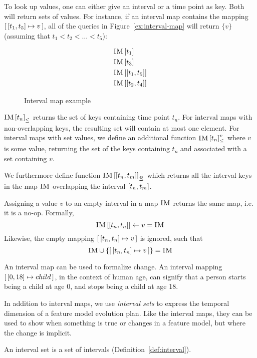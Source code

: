 To look up values, one can either give an interval or a time point as key. Both will return sets of values. For instance, if an interval map  contains the mapping $\intervalmapping{t_1}{t_5}{v}$, all of the queries in Figure~\vref{ex:interval-map} will return $\{v\}$ (assuming that $t_1 < t_2 < \ldots < t_5$):

\begin{figure}[h]
  \begin{align*}
    & \lookup{\map{IM}}{t_1} \\
    & \lookup{\map{IM}}{t_3} \\
    & \lookup{\map{IM}}{\interval{t_1}{t_5}} \\
    & \lookup{\map{IM}}{\interval{t_2}{t_4}}
  \end{align*}
  \caption{Interval map example}
  \label{ex:interval-map}
\end{figure}

${\textsc{IM} \left[ t_n \right]}_{\leq}$ returns the set of keys containing time point $t_n$. For interval maps with non-overlapping keys, the resulting set will contain at most one element. For interval maps with set values, we define an additional function ${\textsc{IM} \left[ t_n \right]^{v}_{\leq}}$ where $v$ is some value, returning the set of the keys containing $t_n$ and associated with a set containing $v$. 

We furthermore define function $\overlapping{\map{IM}}{t_n}{t_m}$ which returns all the interval keys in the map $\textsc{IM}$ overlapping the interval $\interval{t_n}{t_m}$. 

Assigning a value $v$ to an empty interval in a map $\textsc{IM}$ returns the same map, i.e. it is a no-op. Formally,
\[
  \lookup{\map{IM}}{\interval{t_n}{t_n}} \assign v = \map{IM}
\]
Likewise, the empty mapping $\intervalmapping{t_n}{t_n}{v}$ is ignored, such that
\[
  \map{IM} \cup \set{\intervalmapping{t_n}{t_n}{v}} = \map{IM}
\]

An interval map can be used to formalize change. An interval mapping $\intervalmapping{0}{18}{child}$, in the context of human age, can signify that a person starts being a child at age 0, and stops being a child at age 18.

In addition to interval maps, we use \emph{interval sets} to express the temporal dimension of a feature model evolution plan. Like the interval maps, they can be used to show when something is true or changes in a feature model, but where the change is implicit. 
\\
\begin{definition}
  An interval set is a set of intervals (Definition~\vref{def:interval}). 
\end{definition}

